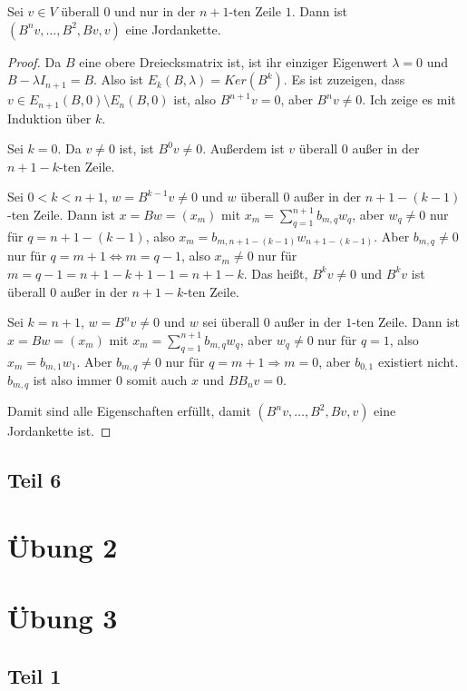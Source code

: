 \documentclass[10pt,a4paper]{article}
\begin{document}
Sei $v \in V$ überall $0$ und nur in der $n + 1$-ten Zeile $1$.
Dann ist $(B^{n}v, \dots, B^{2}, Bv, v)$ eine Jordankette.

\begin{proof}
Da $B$ eine obere Dreiecksmatrix ist, ist ihr einziger Eigenwert $\lambda = 0$ und $B - \lambda I_{n + 1} = B$.
Also ist $E_{k}(B, \lambda) = Ker(B^{k})$. 
Es ist zuzeigen, dass $v \in E_{n + 1}(B, 0) \setminus E_{n}(B, 0)$ ist, also $B^{n + 1}v = 0$, aber $B^{n}v \ne 0$.
Ich zeige es mit Induktion über $k$.

Sei $k = 0$.
Da $v \ne 0$ ist, ist $B^{0}v \ne 0$.
Außerdem ist $v$ überall $0$ außer in der $n + 1 - k$-ten Zeile.

Sei $0 < k < n + 1$, $w = B^{k - 1}v \ne 0$ und $w$ überall $0$ außer in der $n + 1 - (k - 1)$-ten Zeile.
Dann ist $x = Bw = (x_{m})$ mit $x_{m} = \sum_{q = 1}^{n + 1} b_{m, q} w_{q}$, aber $w_{q} \ne 0$ nur für $q = n + 1 - (k - 1)$, also $x_{m} = b_{m, n + 1 - (k - 1)} w_{n + 1 - (k - 1)}$.
Aber $b_{m, q} \ne 0$ nur für $q = m + 1 \Leftrightarrow m = q - 1$, also $x_{m} \ne 0$ nur für $m = q - 1 = n + 1 - k + 1 - 1 = n + 1 - k$.
Das heißt, $B^{k}v \ne 0$ und $B^{k}v$ ist überall $0$ außer in der $n + 1 - k$-ten Zeile.

Sei $k = n + 1$, $w = B^{n}v \ne 0$ und $w$ sei überall $0$ außer in der $1$-ten Zeile.
Dann ist $x = Bw = (x_{m})$ mit $x_{m} = \sum_{q = 1}^{n + 1} b_{m, q} w_{q}$, aber $w_{q} \ne 0$ nur für $q = 1$, also $x_{m} = b_{m, 1} w_{1}$.
Aber $b_{m, q} \ne 0$ nur für $q = m + 1 \Rightarrow m = 0$, aber $b_{0, 1}$ existiert nicht.
$b_{m, q}$ ist also immer $0$ somit auch $x$ und $BB_{n}v = 0$.

Damit sind alle Eigenschaften erfüllt, damit $(B^{n}v, \dots, B^{2}, Bv, v)$ eine Jordankette ist.
\end{proof}

\subsection*{Teil 6}

\section*{Übung 2}

\section*{Übung 3}

\subsection*{Teil 1}
\end{document}
